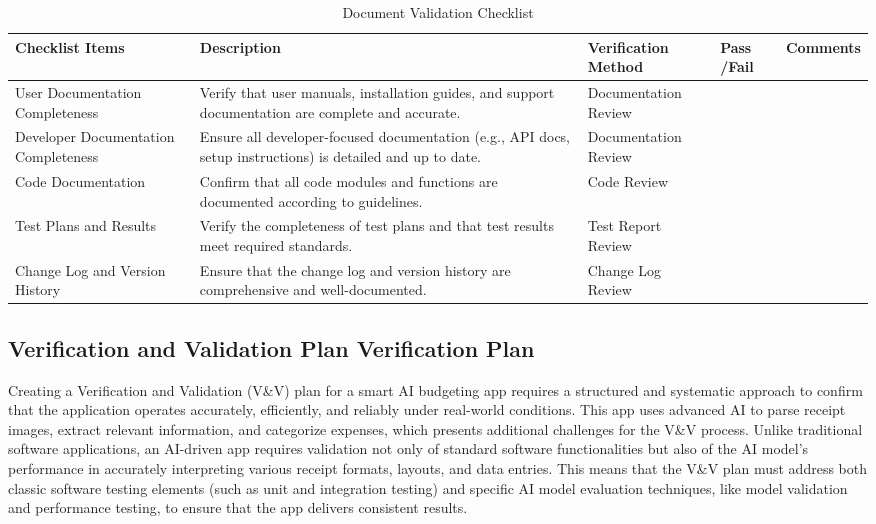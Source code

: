 \documentclass[12pt, titlepage]{article}
\begin{document}
\begin{table}[h!]
\caption{Document Validation Checklist}
\noindent \begin{tabular}{|>{\raggedright\arraybackslash}p{3cm}|>{\raggedright\arraybackslash}p{4cm}|>{\raggedright\arraybackslash}p{3cm}|p{1cm}|p{2.25cm}|}
	\hline
	\textbf{Checklist Items} & \textbf{Description} & \textbf{Verification Method} & \textbf{Pass /Fail} & \textbf{Comments} \\ 
	\hline
	User Documentation Completeness	& Verify that user manuals, installation guides, and support documentation are complete and accurate. & Documentation Review & & \\
	\hline
	Developer Documentation Completeness & Ensure all developer-focused documentation (e.g., API docs, setup instructions) is detailed and up to date. & Documentation Review & & \\ 
	\hline
	Code Documentation & Confirm that all code modules and functions are documented according to guidelines. & Code Review & & \\
	\hline
	Test Plans and Results & Verify the completeness of test plans and that test results meet required standards. & Test Report Review & & \\
	\hline
	Change Log and Version History & Ensure that the change log and version history are comprehensive and well-documented. & Change Log Review & & \\ 
	\hline
\end{tabular}
\end{table}

\subsection{Verification and Validation Plan Verification Plan}

Creating a Verification and Validation (V\&V) plan for a smart AI budgeting app requires a structured and systematic approach to confirm that the application operates accurately, efficiently, and reliably under real-world conditions.
This app uses advanced AI to parse receipt images, extract relevant information, and categorize expenses, which presents additional challenges for the V\&V process.
Unlike traditional software applications, an AI-driven app requires validation not only of standard software functionalities but also of the AI model's performance in accurately interpreting various receipt formats, layouts, and data entries.
This means that the V\&V plan must address both classic software testing elements (such as unit and integration testing) and specific AI model evaluation techniques, like model validation and performance testing, to ensure that the app delivers consistent results. \\
\end{document}
